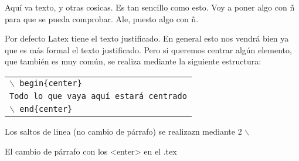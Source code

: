 \documentclass[10pt,a4paper,titlepage]{article} %
\begin{document}
	Aquí va texto, y otras cosicas. Es tan sencillo como esto. Voy a poner algo con ñ para que se pueda comprobar. Ale, puesto algo con ñ.

	Por defecto Latex tiene el texto justificado. En general esto nos vendrá bien ya que es más formal el texto justificado. Pero si queremos centrar algún elemento, que también es muy común, se realiza mediante la siguiente estructura:
	\begin{center}
	\begin{tabular}{l}
		\texttt{$\backslash$ begin\{center\}} \\
			\hspace{1cm}\texttt{Todo lo que vaya aquí estará centrado} \\
		\texttt{$\backslash$ end\{center\}} \\
	\end{tabular}
	\end{center}

	Los saltos de linea (no cambio de párrafo) se realizazn mediante 2 $\backslash$

	El cambio de párrafo con los <enter> en el .tex
\end{document}
